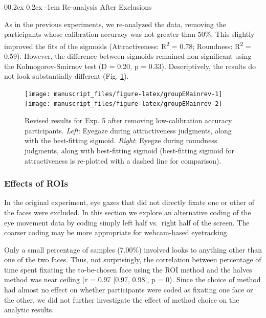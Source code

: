 \documentclass[
  man,floatsintext]{apa6}
\makeatletter
\let\oldparagraph\paragraph
\renewcommand{\paragraph}[1]{\oldparagraph{#1}\mbox{}}
\renewcommand{\paragraph}{\@startsection{paragraph}{4}{\parindent}%
  {0\baselineskip \@plus 0.2ex \@minus 0.2ex}%
  {-1em}%
  {\normalfont\normalsize\bfseries\itshape\typesectitle}}
\makeatother
\begin{document}
\paragraph{Re-analysis After Exclusions}\label{re-analysis-after-exclusions-5}

As in the previous experiments, we re-analyzed the data, removing the participants whose calibration accuracy was not greater than 50\%. This slightly improved the fits of the sigmoids (Attractiveness: R\textsuperscript{2} = 0.78; Roundness: R\textsuperscript{2} = 0.59). However, the difference between sigmoids remained non-significant using the Kolmogorov-Smirnov test (D = 0.20, p = 0.33). Descriptively, the results do not look substantially different (Fig. \ref{fig:groupEMainrev}).



\begin{figure}
\texttt{[image: manuscript\_files/figure-latex/groupEMainrev-1]} \texttt{[image: manuscript\_files/figure-latex/groupEMainrev-2]} \caption{Revised results for Exp. 5 after removing low-calibration accuracy participants. \emph{Left}: Eyegaze during attractiveness judgments, along with the best-fitting sigmoid. \emph{Right}: Eyegze during roundness judgments, along with best-fitting sigmoid (best-fitting sigmoid for attractiveness is re-plotted with a dashed line for comparison).}\label{fig:groupEMainrev}
\end{figure}

\subsubsection{Effects of ROIs}\label{effects-of-rois-2}

In the original experiment, eye gazes that did not directly fixate one or other of the faces were excluded. In this section we explore an alternative coding of the eye movement data by coding simply left half vs.~right half of the screen. The coarser coding may be more appropriate for webcam-based eyetracking.

Only a small percentage of samples (7.00\%) involved looks to anything other than one of the two faces. Thus, not surprisingly, the correlation between percentage of time spent fixating the to-be-chosen face using the ROI method and the halves method was near ceiling (r = 0.97 {[}0.97, 0.98{]}, p = 0). Since the choice of method had almost no effect on whether participants were coded as fixating one face or the other, we did not further investigate the effect of method choice on the analytic results.
\end{document}
